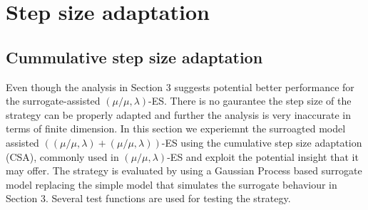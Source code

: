 










\section{Step size adaptation}

\subsection{Cummulative step size adaptation}

Even though the analysis in Section 3 suggests potential better performance for the surrogate-assisted $(\mu/\mu,\lambda)$-ES. There is no gaurantee the step size of the strategy can be properly adapted and further the analysis is very inaccurate in terms of finite dimension. In this section we experiemnt the surroagted model assisted $((\mu/\mu,\lambda)+(\mu/\mu,\lambda))$-ES using the cumulative step size adaptation (CSA)\cite{Ostermeier:1994:DAS:1326675.1326679}, commonly used in $(\mu/\mu,\lambda)$-ES and exploit the potential insight that it may offer. The strategy is evaluated by using a Gaussian Process based surrogate model replacing the simple model that simulates the surrogate behaviour in Section 3. Several test functions are used for testing the strategy.

